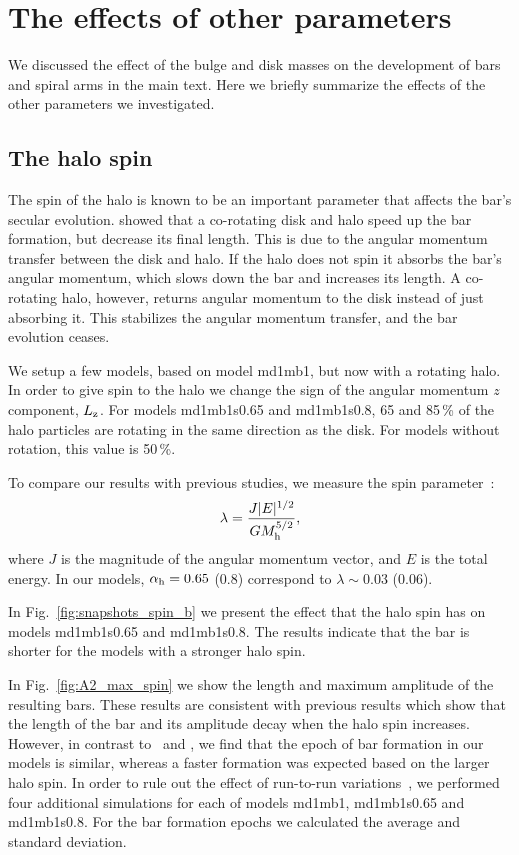 
\section[]{The effects of other parameters}

We discussed the effect of the bulge and disk masses on the
development of bars and spiral arms in the main text. Here we briefly
summarize the effects of the other parameters we investigated.


\subsection{The halo spin}

The spin of the halo is known to be an important parameter that 
affects the bar's secular evolution. 
\citet{2014ApJ...783L..18L} showed that a co-rotating disk and halo 
speed up the bar formation, but decrease its final length. This 
is due to the angular momentum transfer between the disk and halo.
If the halo does not spin it absorbs the bar's angular momentum, 
which slows down the bar and increases its length. 
A co-rotating halo, however, returns angular momentum to the disk instead of 
just absorbing it. 
This stabilizes the angular momentum transfer, and the bar evolution ceases.

We setup a few models, based on model md1mb1, but now with a rotating halo. 
In order to give spin to the halo we change the sign of the angular momentum $z$ component, $L_{\rm z}$.
For models md1mb1s0.65 and md1mb1s0.8, 65 and 85\,\% of the halo particles are rotating in the same 
direction as the disk. For models without rotation, this value is 50\,\%. 

To compare our results with previous studies, we measure the spin 
parameter~\citet{1969ApJ...155..393P,1971A&A....11..377P}:
\begin{eqnarray}
\lambda = \frac{J|E|^{1/2}}{GM_{\rm h}^{5/2}},
\end{eqnarray}
where $J$ is the magnitude of the angular momentum vector, and $E$ is the total 
energy.
In our models, $\alpha_{\rm h}=0.65$ (0.8) correspond 
to $\lambda\sim0.03$ (0.06).


In Fig.~\ref{fig:snapshots_spin_b} we present the effect that the halo spin
has on models md1mb1s0.65 and md1mb1s0.8. 
The results indicate that  
the bar is shorter for the models with a stronger halo spin.

In Fig.~\ref{fig:A2_max_spin} we show the length and maximum amplitude of
the resulting bars.
These results are consistent with previous results which show that
the length of the bar and its amplitude decay when the halo spin increases.
However, in contrast to~\citet{2013MNRAS.434.1287S} and \citet{2014ApJ...783L..18L} ,
we find that the epoch of bar formation in our models is similar, 
whereas a faster formation was expected based on the larger halo spin. 
In order to rule out the effect of run-to-run variations~\citep{2009MNRAS.398.1279S},
we performed four additional simulations for each of models md1mb1, md1mb1s0.65 and md1mb1s0.8.
For the bar formation epochs we calculated the average and standard deviation. 

